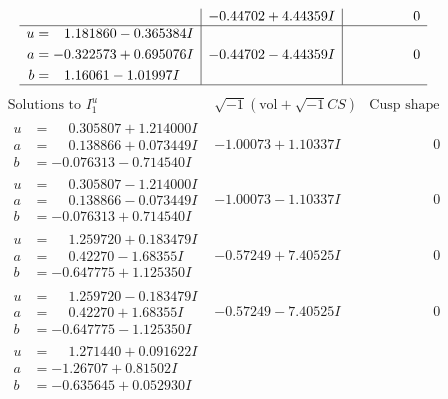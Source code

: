 \documentclass[1p]{elsarticle_modified}
\theoremstyle{definition}
\newcommand{\I}{\sqrt{-1}}
\begin{document}
$$\begin{array}{c|c|c}
 & -0.44702 + 4.44359 I & \phantom{-0.000000 } 0 \\ \hline\begin{aligned}
u &= \phantom{-}1.181860 - 0.365384 I \\
a &= -0.322573 + 0.695076 I \\
b &= \phantom{-}1.16061 - 1.01997 I\end{aligned}
 & -0.44702 - 4.44359 I & \phantom{-0.000000 } 0\\
 \hline 
 \end{array}$$\newpage$$\begin{array}{c|c|c}  
\text{Solutions to }I^u_{1}& \I (\text{vol} + \sqrt{-1}CS) & \text{Cusp shape}\\
 \hline 
\begin{aligned}
u &= \phantom{-}0.305807 + 1.214000 I \\
a &= \phantom{-}0.138866 + 0.073449 I \\
b &= -0.076313 - 0.714540 I\end{aligned}
 & -1.00073 + 1.10337 I & \phantom{-0.000000 } 0 \\ \hline\begin{aligned}
u &= \phantom{-}0.305807 - 1.214000 I \\
a &= \phantom{-}0.138866 - 0.073449 I \\
b &= -0.076313 + 0.714540 I\end{aligned}
 & -1.00073 - 1.10337 I & \phantom{-0.000000 } 0 \\ \hline\begin{aligned}
u &= \phantom{-}1.259720 + 0.183479 I \\
a &= \phantom{-}0.42270 - 1.68355 I \\
b &= -0.647775 + 1.125350 I\end{aligned}
 & -0.57249 + 7.40525 I & \phantom{-0.000000 } 0 \\ \hline\begin{aligned}
u &= \phantom{-}1.259720 - 0.183479 I \\
a &= \phantom{-}0.42270 + 1.68355 I \\
b &= -0.647775 - 1.125350 I\end{aligned}
 & -0.57249 - 7.40525 I & \phantom{-0.000000 } 0 \\ \hline\begin{aligned}
u &= \phantom{-}1.271440 + 0.091622 I \\
a &= -1.26707 + 0.81502 I \\
b &= -0.635645 + 0.052930 I\end{aligned}

\end{array}$$
\end{document}
